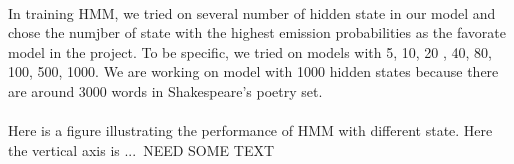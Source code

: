 \paragraph{}
In training HMM, we tried on several number of hidden state in our model and chose the numjber of state with the highest emission probabilities as the favorate model in the project. To be specific, we tried on models with 5, 10, 20 , 40, 80, 100, 500, 1000. We are working on model with 1000 hidden states because there are around 3000 words in Shakespeare's poetry set.
\paragraph{}
Here is a figure illustrating the performance of HMM with different state. Here the vertical axis is ...{\color{blue}\ NEED SOME TEXT}

